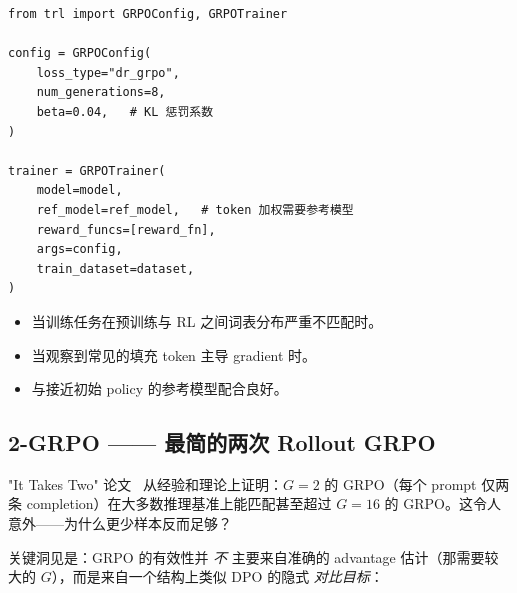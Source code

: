 \begin{examplebox}
\begin{lstlisting}[style=pythonstyle]
from trl import GRPOConfig, GRPOTrainer

config = GRPOConfig(
    loss_type="dr_grpo",
    num_generations=8,
    beta=0.04,   # KL 惩罚系数
)

trainer = GRPOTrainer(
    model=model,
    ref_model=ref_model,   # token 加权需要参考模型
    reward_funcs=[reward_fn],
    args=config,
    train_dataset=dataset,
)
\end{lstlisting}
\end{examplebox}

\begin{keybox}
\begin{itemize}
  \item 当训练任务在预训练与 RL 之间词表分布严重不匹配时。
  \item 当观察到常见的填充 token 主导 gradient 时。
  \item 与接近初始 policy 的参考模型配合良好。
\end{itemize}
\end{keybox}

\subsection{2-GRPO —— 最简的两次 Rollout GRPO}
\label{sec:2grpo}

\begin{intuitionbox}["It Takes Two" 洞见]
"It Takes Two" 论文~\cite{xu2025twograpo} 从经验和理论上证明：$G=2$ 的 GRPO（每个 prompt 仅两条 completion）在大多数推理基准上能匹配甚至超过 $G=16$ 的 GRPO。这令人意外——为什么更少样本反而足够？
\end{intuitionbox}

关键洞见是：GRPO 的有效性并 \emph{不} 主要来自准确的 advantage 估计（那需要较大的 $G$），而是来自一个结构上类似 DPO 的隐式 \emph{对比目标}：

